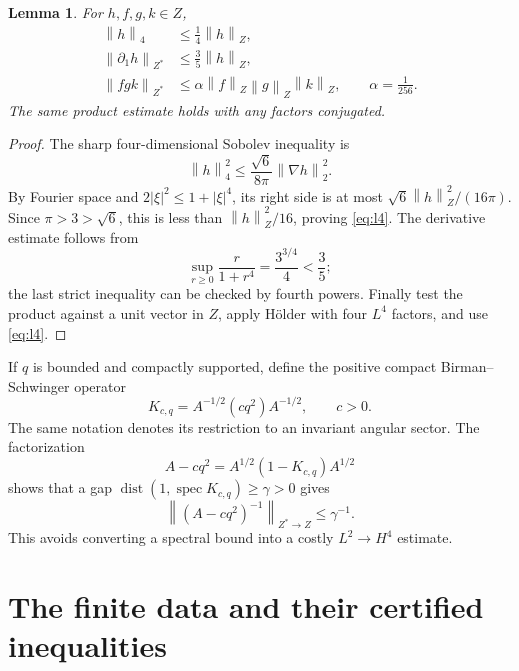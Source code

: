 \documentclass[11pt,a4paper]{article}
\newtheorem{lemma}[theorem]{Lemma}
\theoremstyle{definition}\newtheorem{definition}[theorem]{Definition}
\theoremstyle{remark}\newtheorem{remark}[theorem]{Remark}
\newcommand{\norm}[1]{\left\|#1\right\|}
\newcommand{\spec}{\operatorname{spec}}
\newcommand{\dist}{\operatorname{dist}}
\begin{document}
\begin{lemma}\label{lem:sobolev}
For \(h,f,g,k\in Z\),
\begin{align}
 \norm h_4&\le\tfrac14\norm h_Z,\label{eq:l4}\\
 \norm{\partial_1h}_{Z^*}&\le\tfrac35\norm h_Z,\label{eq:derivative}\\
 \norm{f g k}_{Z^*}&\le\alpha\norm f_Z\norm g_Z\norm k_Z,
 \qquad\alpha=\tfrac1{256}.\label{eq:trilinear}
\end{align}
The same product estimate holds with any factors conjugated.
\end{lemma}
\begin{proof}
The sharp four-dimensional Sobolev inequality \cite{Talenti} is
\[
 \norm h_4^2\le\frac{\sqrt6}{8\pi}\norm{\nabla h}_2^2.
\]
By Fourier space and \(2|\xi|^2\le1+|\xi|^4\), its right side is at most
\(\sqrt6\norm h_Z^2/(16\pi)\). Since \(\pi>3>\sqrt6\), this is less than \(\norm h_Z^2/16\), proving \eqref{eq:l4}. The derivative estimate follows from
\[
 \sup_{r\ge0}\frac{r}{1+r^4}=\frac{3^{3/4}}4<\frac35;
\]
the last strict inequality can be checked by fourth powers. Finally test the product against a unit vector in \(Z\), apply H\"older with four \(L^4\) factors, and use \eqref{eq:l4}.
\end{proof}

If \(q\) is bounded and compactly supported, define the positive compact Birman--Schwinger operator
\begin{equation}\label{eq:bs}
 K_{c,q}=A^{-1/2}(c q^2)A^{-1/2},\qquad c>0.
\end{equation}
The same notation denotes its restriction to an invariant angular sector. The factorization
\begin{equation}\label{eq:factorization}
 A-cq^2=A^{1/2}(1-K_{c,q})A^{1/2}
\end{equation}
shows that a gap \(\dist(1,\spec K_{c,q})\ge\gamma>0\) gives
\begin{equation}\label{eq:inverse}
 \norm{(A-cq^2)^{-1}}_{Z^*\to Z}\le\gamma^{-1}.
\end{equation}
This avoids converting a spectral bound into a costly \(L^2\to H^4\) estimate.

\section{The finite data and their certified inequalities}\label{sec:data}
\end{document}
